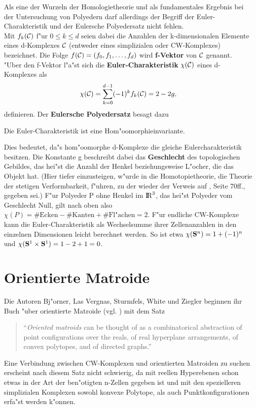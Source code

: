 Als eine der Wurzeln der Homologietheorie und als fundamentales Ergebnis bei
der Untersuchung von Polyedern darf allerdings der Begriff der
Euler-Charakteristik und der Eulersche Polyedersatz
 nicht fehlen.\\
Mit $f_k(\cal C)$ f"ur $0\leq k\leq d$ seien dabei die Anzahlen der
k-dimensionalen Elemente eines d-Komplexes $\cal C$ (entweder eines simplizialen
oder CW-Komplexes) bezeichnet. Die Folge $f({\cal C})=(f_0,f_1,\ldots,f_d)$
wird {\bf f-Vektor} von $\cal C$ genannt.\\
"Uber den f-Vektor l"a"st sich die {\bf Euler-Charakteristik} $\chi(\cal C)$
eines d-Komplexes als
$$ \chi({\cal C}) = \sum\limits_{k=0}^{d-1} (-1)^k f_k({\cal C})=2-2g, $$
definieren. Der {\bf Eulersche Polyedersatz} besagt dazu
\begin{satz}
Die Euler-Charakteristik ist eine Hom"oomorphieinvariante.
\end{satz}
Dies bedeutet, da"s hom"oomorphe d-Komplexe die gleiche Eulercharakteristik
besitzen. Die Konstante g beschreibt dabei das {\bf Geschlecht} des
 topologischen Gebildes, das hei"st die Anzahl der Henkel
beziehungsweise L"ocher, die das Objekt hat. (Hier tiefer einzusteigen, w"urde
in die Homotopietheorie, die Theorie der stetigen Verformbarkeit, f"uhren, zu
der wieder der Verweis auf \cite{Os:92}, Seite 70ff., gegeben sei.)
F"ur Polyeder P ohne Henkel im $\R^3$, das hei"st Polyeder vom Geschlecht
Null, gilt nach oben also
$\chi(P)=\#\mbox{Ecken}-\#\mbox{Kanten}+\#\mbox{Fl"achen}=2$.
F"ur endliche CW-Komplexe kann die Euler-Charakteristik als
Wechselsumme ihrer Zellenanzahlen in den einzelnen Dimensionen leicht
berechnet werden. So ist etwa $\chi(\S^n) = 1 + (-1)^n$ und
$\chi(\S^1\times\S^1) = 1 - 2 + 1 = 0$.

\section{Orientierte Matroide}

Die Autoren Bj"orner, Las Vergnas, Sturmfels, White und Ziegler beginnen ihr
Buch "uber orientierte Matroide (vgl. \cite{Bj:93}) mit dem Satz
\begin{quote}{\sf
"`{\it Oriented matroids} can be thought of as a combinatorical abstraction
of point configurations over the reals, of real hyperplane arrangements, of
convex polytopes, and of directed graphs."'
}\end{quote}
Eine Verbindung zwischen CW-Komplexen und orientierten Matroiden zu suchen
erscheint nach diesem Satz nicht schwierig, da mit reellen Hyperebenen schon
etwas in der Art der ben"otigten n-Zellen gegeben ist und mit den spezielleren
simplizialen Komplexen sowohl konvexe Polytope, als auch Punktkonfigurationen
erfa"st werden k"onnen.

